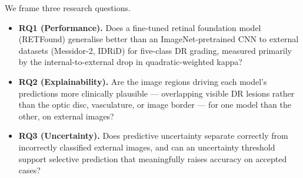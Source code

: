 \documentclass[journal]{IEEEtran}
\renewcommand{\_}{\origunderscore\allowbreak}
\begin{document}
We frame three research questions.
\begin{itemize}
  \item \textbf{RQ1 (Performance).} Does a fine-tuned retinal foundation model
    (RETFound) generalise better than an ImageNet-pretrained CNN to external
    datasets (Messidor-2, IDRiD) for five-class DR grading, measured primarily by
    the internal-to-external drop in quadratic-weighted kappa?
  \item \textbf{RQ2 (Explainability).} Are the image regions driving each
    model's predictions more clinically plausible --- overlapping visible DR
    lesions rather than the optic disc, vasculature, or image border --- for one
    model than the other, on external images?
  \item \textbf{RQ3 (Uncertainty).} Does predictive uncertainty separate
    correctly from incorrectly classified external images, and can an uncertainty
    threshold support selective prediction that meaningfully raises accuracy on
    accepted cases?
\end{itemize}
\end{document}
